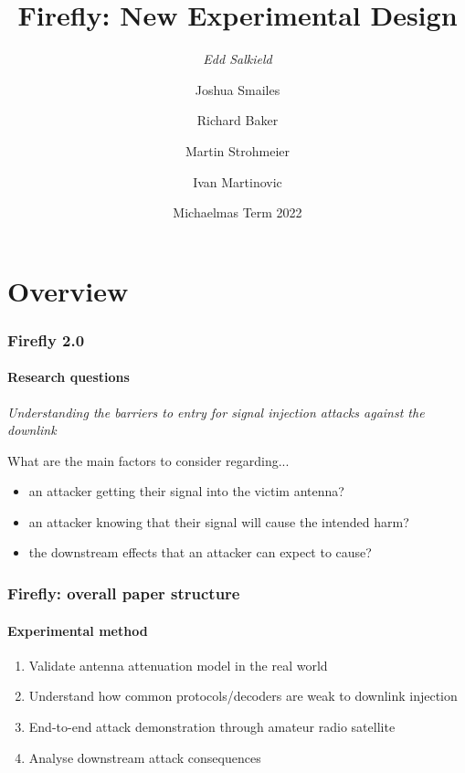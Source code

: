 \documentclass{beamer}
\begin{document}
\title[Exploiting Implicit Trust in Satellite Downlink Processing Systems]{Firefly: New Experimental Design}
\author[Edd Salkield]{
  \emph{Edd Salkield}
  \and
  Joshua Smailes
  \and
  Richard Baker
  \and
  Martin Strohmeier
  \and
  Ivan Martinovic
}
\date{Michaelmas Term 2022}

\makeoxfordtitle

\section{Overview}

\begin{frame}
  \frametitle{Firefly 2.0}
  \framesubtitle{Research questions}

  \textit{Understanding the barriers to entry for signal injection attacks against the downlink}

  What are the main factors to consider regarding...
  \begin{itemize}
    \item an attacker getting their signal into the victim antenna?
    \item an attacker knowing that their signal will cause the intended harm?
    \item the downstream effects that an attacker can expect to cause?
  \end{itemize}
\end{frame}

\begin{frame}
  \frametitle{Firefly: overall paper structure}
  \framesubtitle{Experimental method}

  \begin{enumerate}
    \item Validate antenna attenuation model in the real world
    \item Understand how common protocols/decoders are weak to downlink injection
    \item End-to-end attack demonstration through amateur radio satellite
    \item Analyse downstream attack consequences
  \end{enumerate}
\end{frame}

\end{document}
